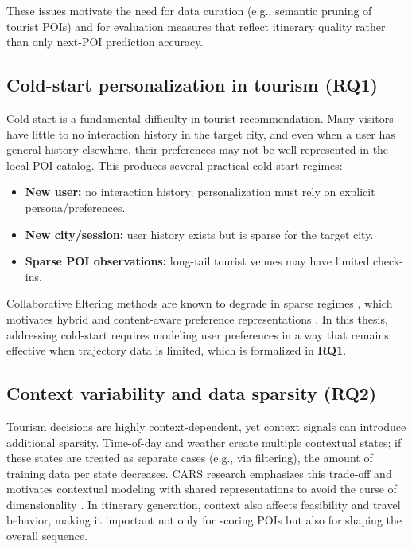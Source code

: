 These issues motivate the need for data curation (e.g., semantic pruning of tourist POIs) and for evaluation measures that reflect itinerary quality rather than only next-POI prediction accuracy.

\subsection{Cold-start personalization in tourism (\textbf{RQ1})}
Cold-start is a fundamental difficulty in tourist recommendation. Many visitors have little to no interaction history in the target city, and even when a user has general history elsewhere, their preferences may not be well represented in the local POI catalog. This produces several practical cold-start regimes:
\begin{itemize}[leftmargin=*]
    \item \textbf{New user:} no interaction history; personalization must rely on explicit persona/preferences.
    \item \textbf{New city/session:} user history exists but is sparse for the target city.
    \item \textbf{Sparse POI observations:} long-tail tourist venues may have limited check-ins.
\end{itemize}
Collaborative filtering methods are known to degrade in sparse regimes \citep{koren2009mf}, which motivates hybrid and content-aware preference representations \citep{burke2002hybrid}. In this thesis, addressing cold-start requires modeling user preferences in a way that remains effective when trajectory data is limited, which is formalized in \textbf{RQ1}.

\subsection{Context variability and data sparsity (\textbf{RQ2})}
Tourism decisions are highly context-dependent, yet context signals can introduce additional sparsity. Time-of-day and weather create multiple contextual states; if these states are treated as separate cases (e.g., via filtering), the amount of training data per state decreases. CARS research emphasizes this trade-off and motivates contextual modeling with shared representations to avoid the curse of dimensionality \citep{adomavicius2005tois, adomavicius2022cars, villegas2018cars}. In itinerary generation, context also affects feasibility and travel behavior, making it important not only for scoring POIs but also for shaping the overall sequence.

